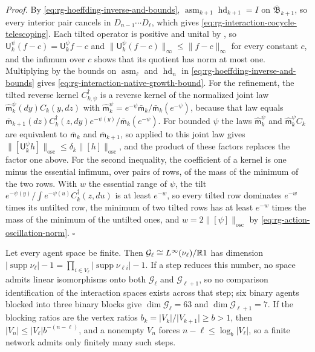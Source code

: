 \noindent\emph{Proof.}
By \eqref{eq:rg-hoeffding-inverse-and-bounds},
$\operatorname{asm}_{k+1}\operatorname{hd}_{k+1}=I$ on $\overline{\mathfrak
B}_{k+1}$, so every interior pair cancels in $D_{n-1}\cdots D_\ell$, which gives
\eqref{eq:rg-interaction-cocycle-telescoping}. Each tilted operator is positive and
unital by , so $\mathsf U_k^\psi(f-c)=\mathsf
U_k^\psi f-c$ and $\lVert\mathsf U_k^\psi(f-c)\rVert_\infty\le\lVert
f-c\rVert_\infty$ for every constant $c$, and the infimum over $c$ shows that its
quotient has norm at most one. Multiplying by the bounds on
$\operatorname{asm}_\ell$ and $\operatorname{hd}_n$ in
\eqref{eq:rg-hoeffding-inverse-and-bounds} gives
\eqref{eq:rg-interaction-native-growth-bound}. For the refinement, the tilted reverse kernel
$C^\dagger_{k,\psi}$ is a reverse kernel of the normalized joint law
$\widehat{\mathsf m}^\psi_k(dy)C_k(y,dz)$ with
$\widehat{\mathsf m}^\psi_k=e^{-\psi}\bar{\mathsf m}_k/\bar{\mathsf m}_k(e^{-\psi})$, because that
law equals $\bar{\mathsf m}_{k+1}(dz)C^\dagger_k(z,dy)e^{-\psi(y)}/\bar{\mathsf m}_k(e^{-\psi})$.
For bounded $\psi$ the laws $\widehat{\mathsf m}^\psi_k$ and $\widehat{\mathsf m}^\psi_kC_k$ are
equivalent to $\bar{\mathsf m}_k$ and $\bar{\mathsf m}_{k+1}$, so
 applied to this joint law gives
$\lVert[\mathsf U_k^\psi h]\rVert_{\mathrm{osc}}\le\delta_k\lVert[h]\rVert_{\mathrm{osc}}$, and the
product of these factors replaces the factor one above. For the second inequality, the
coefficient of a kernel is one minus the essential infimum, over pairs of rows, of the mass of
the minimum of the two rows. With $w$ the essential range of $\psi$, the tilt
$e^{-\psi(y)}/\int e^{-\psi(u)}C^\dagger_k(z,du)$ is at least $e^{-w}$, so every tilted row
dominates $e^{-w}$ times its untilted row, the minimum of two tilted rows has at least $e^{-w}$
times the mass of the minimum of the untilted ones, and $w=2\lVert[\psi]\rVert_{\mathrm{osc}}$ by
\eqref{eq:rg-action-oscillation-norm}. $\square$

Let every agent space be finite. Then $\mathcal G_\ell\cong
L^\infty(\nu_\ell)/\mathbb R1$ has dimension
$\lvert\operatorname{supp}\nu_\ell\rvert-1
=\prod_{i\in V_\ell}\lvert\operatorname{supp}\nu_{\ell i}\rvert-1$. If a step reduces
this number, no space admits linear isomorphisms onto both $\mathcal G_\ell$ and
$\mathcal G_{\ell+1}$, so no comparison identification of the interaction spaces
exists across that step; six binary agents blocked into three binary blocks give
$\dim\mathcal G_\ell=63$ and $\dim\mathcal G_{\ell+1}=7$. If the blocking ratios are
the vertex ratios $b_k=\lvert V_k\rvert/\lvert V_{k+1}\rvert\ge b>1$, then
$\lvert V_n\rvert\le\lvert V_\ell\rvert b^{-(n-\ell)}$, and a nonempty $V_n$ forces
$n-\ell\le\log_b\lvert V_\ell\rvert$, so a finite network admits only finitely many
such steps. 

